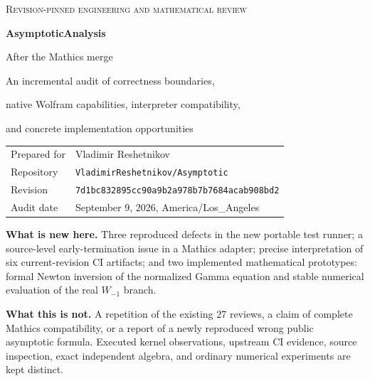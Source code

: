 \documentclass[11pt,letterpaper]{article}
\newcommand{\revision}{\texttt{7d1bc832895cc90a9b2a978b7b7684acab908bd2}}
\begin{document}
\begin{titlepage}
\vspace*{0.55in}
{\small\scshape Revision-pinned engineering and mathematical review\par}
\vspace{0.4in}
{\Huge\bfseries\color{ink} AsymptoticAnalysis\par}
\vspace{0.12in}
{\LARGE After the Mathics merge\par}
\vspace{0.35in}
{\Large An incremental audit of correctness boundaries,\par
native Wolfram capabilities, interpreter compatibility,\par
and concrete implementation opportunities\par}
\vspace{0.65in}
\begin{tabular}{@{}ll@{}}
Prepared for & Vladimir Reshetnikov\\[5pt]
Repository & \texttt{VladimirReshetnikov/Asymptotic}\\[5pt]
Revision & \revision\\[5pt]
Audit date & September 9, 2026, America/Los\_Angeles
\end{tabular}
\vfill
\begin{minipage}{0.95\textwidth}
\textbf{What is new here.} Three reproduced defects in the new portable test runner; a source-level early-termination issue in a Mathics adapter; precise interpretation of six current-revision CI artifacts; and two implemented mathematical prototypes: formal Newton inversion of the normalized Gamma equation and stable numerical evaluation of the real $W_{-1}$ branch.

\textbf{What this is not.} A repetition of the existing 27 reviews, a claim of complete Mathics compatibility, or a report of a newly reproduced wrong public asymptotic formula. Executed kernel observations, upstream CI evidence, source inspection, exact independent algebra, and ordinary numerical experiments are kept distinct.
\end{minipage}
\end{titlepage}
\end{document}
